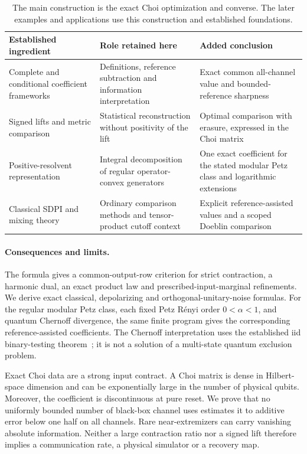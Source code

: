 \documentclass[11pt]{article}
\numberwithin{equation}{section}
\theoremstyle{definition}
\theoremstyle{remark}
\begin{document}
\begin{table}[htbp]
\centering\small
\begin{tabularx}{\textwidth}{@{}p{}YY@{}}
\toprule
Established ingredient & Role retained here & Added conclusion \\
\midrule
Complete and conditional coefficient frameworks~\cite{GHNW26,HGNW26}
 & Definitions, reference subtraction and information interpretation
 & Exact common all-channel value and bounded-reference sharpness \\
Signed lifts and metric comparison~\cite{ZW26v3,Hirche26}
 & Statistical reconstruction without positivity of the lift
 & Optimal comparison with erasure, expressed in the Choi matrix \\
Positive-resolvent representation~\cite{FH14}
 & Integral decomposition of regular operator-convex generators
 & One exact coefficient for the stated modular Petz class and logarithmic extensions \\
Classical SDPI and mixing theory~\cite{OP21,KRW12}
 & Ordinary comparison methods and tensor-product cutoff context
 & Explicit reference-assisted values and a scoped Doeblin comparison \\
\bottomrule
\end{tabularx}
\caption{The main construction is the exact Choi optimization and converse.
The later examples and applications use this construction and established
foundations.}
\label{tab:credit}
\end{table}

\paragraph{Consequences and limits.}
The formula gives a common-output-row criterion for strict contraction, a
harmonic dual, an exact product law and prescribed-input-marginal refinements.
We derive exact classical, depolarizing and orthogonal-unitary-noise formulas.
For the regular modular Petz class, each fixed Petz R\'enyi order
$0<\alpha<1$, and quantum Chernoff divergence, the same finite program gives
the corresponding reference-assisted coefficients. The Chernoff interpretation
uses the established iid binary-testing theorem~\cite{ACM+07,NS09}; it is not a
solution of a multi-state quantum exclusion problem.

Exact Choi data are a strong input contract. A Choi matrix is dense in
Hilbert-space dimension and can be exponentially large in the number of physical
qubits. Moreover, the coefficient is discontinuous at pure reset. We prove that
no uniformly bounded number of black-box channel uses estimates it to additive
error below one half on all channels. Rare near-extremizers can carry vanishing
absolute information. Neither a large contraction ratio nor a signed lift
therefore implies a communication rate, a physical simulator or a recovery map.
\end{document}
